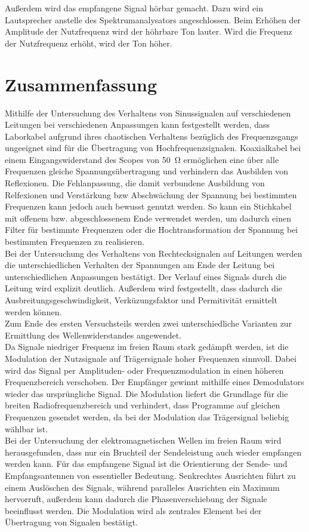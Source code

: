 \documentclass[a4paper,twoside,final]{article}
\begin{document}
Außerdem wird das empfangene Signal hörbar gemacht. Dazu wird ein Lautsprecher anstelle des Spektrumanalysators angeschlossen. Beim Erhöhen der Amplitude der Nutzfrequenz wird der höhrbare Ton lauter. Wird die Frequenz der Nutzfrequenz erhöht, wird der Ton höher.
\section{Zusammenfassung}
Mithilfe der Untersuchung des Verhaltens von Sinussignalen auf verschiedenen Leitungen bei verschiedenen Anpassungen kann festgestellt werden, dass Laborkabel aufgrund ihres chaotischen Verhaltens bezüglich des Frequenzsgangs ungeeignet sind für die Übertragung von Hochfrequenzsignalen. Koaxialkabel bei einem Eingangswiderstand des Scopes von \SI{50}{\ohm} ermöglichen eine über alle Frequenzen gleiche Spannungsübertragung und verhindern das Ausbilden von Reflexionen. Die Fehlanpassung, die damit verbundene Ausbildung von Relfexionen und Verstärkung bzw Abschwächung der Spannung bei bestimmten Frequenzen kann jedoch auch bewusst genutzt werden. So kann ein Stichkabel mit offenem bzw. abgeschlossenem Ende verwendet werden, um dadurch einen Filter für bestimmte Frequenzen oder die Hochtransformation der Spannung bei bestimmten Frequenzen zu realisieren. \\
Bei der Untersuchung des Verhaltens von Rechtecksignalen auf Leitungen werden die unterschiedlichen Verhalten der Spannungen am Ende der Leitung bei unterschiedlichen Anpassungen bestätigt. Der Verlauf eines Signals durch die Leitung wird explizit deutlich. Außerdem wird festgestellt, dass dadurch die Ausbreitungsgeschwindigkeit, Verküzungsfaktor und Permitivität ermittelt werden können.\\ Zum Ende des ersten Versuchsteils werden zwei unterschiedliche Varianten zur Ermittlung des Wellenwiderstandes angewendet.\\
Da Signale niedriger Frequenz im freien Raum stark gedämpft werden, ist die Modulation der Nutzsignale auf Trägersignale hoher Frequenzen sinnvoll. Dabei wird das Signal per Amplituden- oder Frequenzmodulation in einen höheren Frequenzbereich verschoben. Der Empfänger gewinnt mithilfe eines Demodulators wieder das ursprüngliche Signal. Die Modulation liefert die Grundlage für die breiten Radiofrequenzbereich und verhindert, dass Programme auf gleichen Frequenzen gesendet werden, da bei der Modulation das Trägersignal beliebig wählbar ist.\\
Bei der Untersuchung der elektromagnetischen Wellen im freien Raum wird herausgefunden, dass nur ein Bruchteil der Sendeleistung auch wieder empfangen werden kann. Für das empfangene Signal ist die Orientierung der Sende- und Empfangsantennen von essentieller Bedeutung. Senkrechtes Ausrichten führt zu einem Auslöschen des Signals, während paralleles Ausrichten ein Maximum hervorruft, außerdem kann dadurch die Phasenverschiebung der Signale beeinflusst werden. Die Modulation wird als zentrales Element bei der Übertragung von Signalen bestätigt.
\end{document}
